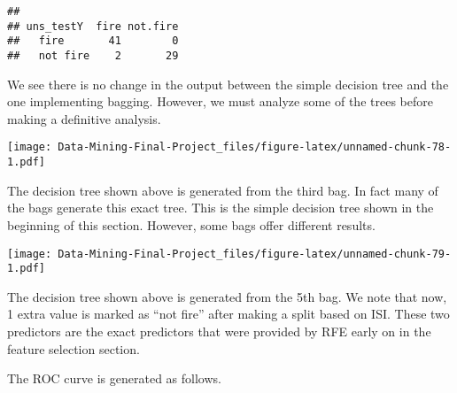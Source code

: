 \documentclass[
]{article}
\newenvironment{Shaded}{\begin{snugshade}}{\end{snugshade}}
\newcommand{\AttributeTok}[1]{\textcolor[rgb]{0.13,0.29,0.53}{#1}}
\newcommand{\DecValTok}[1]{\textcolor[rgb]{0.00,0.00,0.81}{#1}}
\newcommand{\FloatTok}[1]{\textcolor[rgb]{0.00,0.00,0.81}{#1}}
\newcommand{\FunctionTok}[1]{\textcolor[rgb]{0.13,0.29,0.53}{\textbf{#1}}}
\newcommand{\NormalTok}[1]{#1}
\newcommand{\OtherTok}[1]{\textcolor[rgb]{0.56,0.35,0.01}{#1}}
\newcommand{\SpecialCharTok}[1]{\textcolor[rgb]{0.81,0.36,0.00}{\textbf{#1}}}
\newcommand{\StringTok}[1]{\textcolor[rgb]{0.31,0.60,0.02}{#1}}
\begin{document}
\begin{verbatim}
##           
## uns_testY  fire not.fire
##   fire       41        0
##   not fire    2       29
\end{verbatim}

We see there is no change in the output between the simple decision tree
and the one implementing bagging. However, we must analyze some of the
trees before making a definitive analysis.

\begin{Shaded}
\end{Shaded}

\texttt{[image: Data-Mining-Final-Project\_files/figure-latex/unnamed-chunk-78-1.pdf]}

The decision tree shown above is generated from the third bag. In fact
many of the bags generate this exact tree. This is the simple decision
tree shown in the beginning of this section. However, some bags offer
different results.

\begin{Shaded}
\end{Shaded}

\texttt{[image: Data-Mining-Final-Project\_files/figure-latex/unnamed-chunk-79-1.pdf]}

The decision tree shown above is generated from the 5th bag. We note
that now, 1 extra value is marked as ``not fire'' after making a split
based on ISI. These two predictors are the exact predictors that were
provided by RFE early on in the feature selection section.

The ROC curve is generated as follows.
\end{document}
